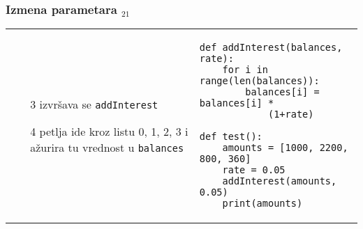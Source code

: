 \documentclass[utf8,compress,aspectratio=169]{beamer}
\begin{document}
\begin{frame}[fragile,shrink=10]
  \frametitle{Izmena parametara $_{21}$}
\begin{tabular}{p{4cm}p{8cm}}
  \begin{itemize}
    \item[3] izvršava se \texttt{addInterest}
    \item[4] petlja ide kroz listu 0, 1, 2, 3 i ažurira tu vrednost u \texttt{balances}
  \end{itemize}
&
\begin{verbatim}
def addInterest(balances, rate):
    for i in range(len(balances)):
        balances[i] = balances[i] *
            (1+rate)

def test():
    amounts = [1000, 2200, 800, 360]
    rate = 0.05
    addInterest(amounts, 0.05)
    print(amounts)
\end{verbatim}
\end{tabular}
\end{frame}
\end{document}
